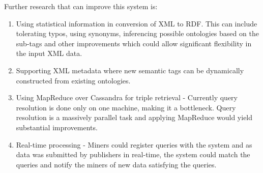 \documentclass[journal]{IEEEtran}
\begin{document}
Further research that can improve this system is:
\begin{enumerate}

    \item Using statistical information in conversion of XML to RDF. This can
        include tolerating typos, using synonyms, inferencing possible
        ontologies based on the sub-tags and other improvements which could
        allow significant flexibility in the input XML data.

    \item Supporting XML metadata where new semantic tags can be dynamically
        constructed from existing ontologies.

    \item Using MapReduce over Cassandra for triple retrieval - Currently query
        resolution is done only on one machine, making it a bottleneck. Query
        resolution is a massively parallel task and applying
        MapReduce\cite{hus09hadoop} would
        yield substantial improvements.

    \item Real-time processing - Miners could register queries with the system
        and as data was submitted by publishers in real-time, the system could
        match the queries and notify the miners of new data satisfying the
        queries.
\end{enumerate}
\end{document}
